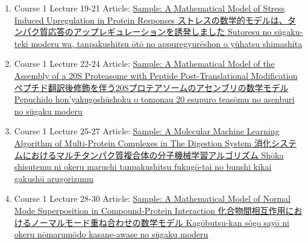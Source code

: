 \documentclass[preprint, 8pt]{elsarticle}
\theoremstyle{definition}
\begin{document}
\begin{CJK}{UTF8}{min}
\begin{enumerate}
\item Course 1  Lecture 19-21 Article: \href{}{Sample:  A Mathematical Model of Stress Induced Upregulation in Protein Responses  ストレスの数学的モデルは、タンパク質応答のアップレギュレーションを誘発しました Sutoresu no sūgaku-teki moderu wa, tanpakushitsu ōtō no appuregyurēshon o yūhatsu shimashita}
\item Course 1  Lecture 22-24 Article: \href{}{Sample: A Mathematical Model of the Assembly of a 20S Proteasome with Peptide Post-Translational Modification ペプチド翻訳後修飾を伴う20Sプロテアソームのアセンブリの数学モデル Pepuchido hon'yakugoshūshoku o tomonau 20 esupuro teasōmu no asenburi no sūgaku moderu}
\item Course 1  Lecture 25-27 Article: \href{}{Sample: A Molecular Machine Learning Algorithm of Multi-Protein Complexes in The Digestion System  消化システムにおけるマルチタンパク質複合体の分子機械学習アルゴリズム Shōka shisutemu ni okeru maruchi tanpakushitsu fukugō-tai no bunshi kikai gakushū arugorizumu}
\item Course 1  Lecture 28-30 Article: \href{}{Sample: A Mathematical Model of Normal Mode Superposition in Compound-Protein Interaction 化合物間相互作用におけるノーマルモード重ね合わせの数学モデル Kagōbutsu-kan sōgo sayō ni okeru nōmarumōdo kasane-awase no sūgaku moderu}
\end{enumerate}

\end{CJK}
\end{document}

